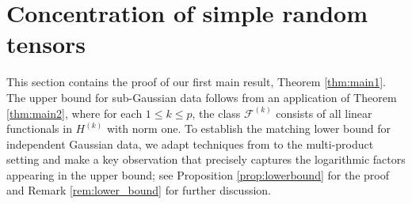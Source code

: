 \documentclass[numbers,webpdf,imaiai]{ima-authoring-template}
\theoremstyle{thmstyletwo}%
\numberwithin{equation}{section}
\numberwithin{equation}{section}
\newcommand{\F}{\mathcal{F}}
\begin{document}
\section{Concentration of simple random tensors}\label{sec:concentration}

This section contains the proof of our first main result, Theorem \ref{thm:main1}. The upper bound for sub-Gaussian data follows from an application of Theorem \ref{thm:main2}, where for each $1\le k\le p$, the class $\F^{(k)}$ consists of all linear functionals in $H^{(k)}$ with norm one. To establish the matching lower bound for independent Gaussian data, we adapt techniques from \cite[Theorem 4]{koltchinskii2017concentration} to the multi-product setting and make a key observation that precisely captures the logarithmic factors appearing in the upper bound; see Proposition \ref{prop:lowerbound} for the proof and Remark \ref{rem:lower_bound} for further discussion.
\end{document}
